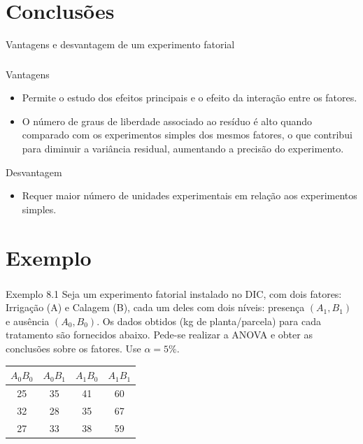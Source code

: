 \documentclass[14pt,aspectratio=1610]{beamer}
\begin{document}
\section{Conclusões}
\begin{frame}{Vantagens e desvantagem de um experimento fatorial}
\frametitle{}
\begin{block}{Vantagens}
\justifying
\begin{itemize}
\item Permite o estudo dos efeitos principais e o efeito da interação entre os
fatores.\pause
\item  O número de graus de liberdade associado ao resíduo é alto quando
comparado com os experimentos simples dos mesmos fatores, o que contribui para diminuir a variância residual, aumentando a precisão do experimento.
\end{itemize}
\end{block}
\pause
\begin{block}{Desvantagem}
\justifying
\begin{itemize}
\item Requer maior número de unidades experimentais em relação aos
experimentos simples.
\end{itemize}
\end{block}
\end{frame}

\section{Exemplo}
\begin{frame}{}
\frametitle{}
\begin{block}{Exemplo 8.1}
\justifying
Seja um experimento fatorial instalado no DIC, com dois fatores: Irrigação
(A) e Calagem (B), cada um deles com dois níveis: presença $(A_{1},B_{1})$ e
ausência $(A_{0},B_{0})$. Os dados obtidos (kg de planta/parcela) para cada
tratamento são fornecidos abaixo. Pede-se realizar a ANOVA e obter as
conclusões sobre os fatores. Use $\alpha=5\%.$
\end{block}

\begin{table}[!h]
\begin{tabular}{cccc}
\hline
$A_{0}B_{0}$&$A_{0}B_{1}$&$A_{1}B_{0}$&$A_{1}B_{1}$\\
\hline
25&35&41&60\\
32&28&35&67\\
27&33&38&59\\
\hline
\end{tabular}
\end{table}
\end{frame}
\end{document}
